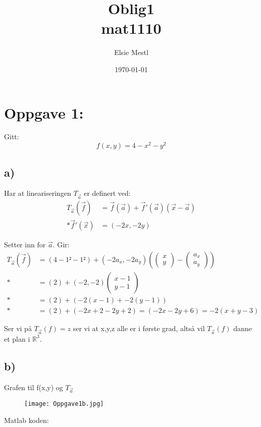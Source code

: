 \documentclass[a4paper, norsk, twoside, 10pt]{article}
\date{\today}
\title{Oblig1 \\ mat1110}
\author{Elsie Mestl}
\begin{document}
\maketitle
  \section*{Oppgave 1:}

  Gitt: \[f(x, y) = 4 - x^{2} - y^{2}\]


  \subsection*{a)}
  Har at lineariseringen $T_{\vec{a}}$ er definert ved:\[
    \begin{split}
      T_{\vec{a}}(\vec{f} ) &= \vec{f}(\vec{a}) +\vec{f}'(\vec{a})(\vec{x} -\vec{a})\\*
      \vec{f}'(\vec{x})&=(-2x, -2y)
    \end{split}
  \]

  Setter inn for $\vec{a}$. Gir: \[
    \begin{split}
      T_{\vec{a}}(\vec{f}) &= (4- 1² -1²) + (-2a_{x}, -2a_{y})\left(\begin{pmatrix}x\\y\end{pmatrix}-\begin{pmatrix}a_{x} \\ a_{y} \end{pmatrix}\right)
       \\*
       &= (2) + (-2, -2)\begin{pmatrix}x-1\\ y-1\end{pmatrix} \\*
          &= (2) + (-2(x-1) + -2(y-1)) \\*
         &= (2) + (-2x+2-2y+2) = (-2x-2y+6) = -2(x+y-3)
    \end{split}
  \]

  Ser vi på $T_{\vec{a}}(f) = z$ ser vi at x,y,z alle er i første grad, altså vil $T_{\vec{a}}(f)$ danne et plan i $\mathbb{R}^{3}$.

  \subsection*{b)}
  Grafen til f(x,y) og $T_{\vec{a}}$
    \begin{figure}[H]
    \begin{center}
    \texttt{[image: Oppgave1b.jpg]}
    \end {center}
    \end{figure}
    Matlab koden:
    
\end{document}
